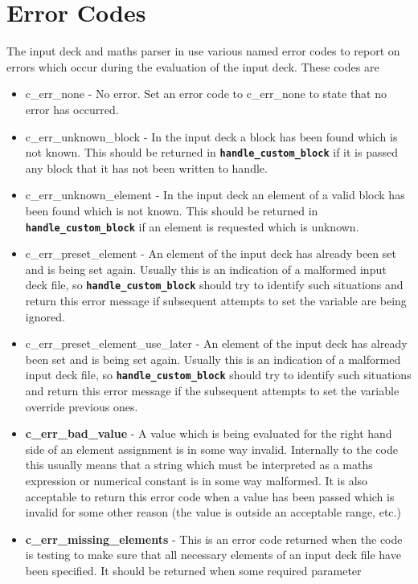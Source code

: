 \documentclass[12pt,a4paper]{article}
\newcommand{\inlinecode}[1]{{\color{warwickred} \bf\texttt{#1}}}
\newcommand{\EPOCH}{{\color{warwickdark}\fontfamily{phv}\selectfont{EPOCH}}}
\begin{document}
\section{Error Codes}
The input deck and maths parser in {\EPOCH} use various named error codes to
report on errors which occur during the evaluation of the input deck. These
codes are
\begin{itemize}
\item c\_err\_none - No error. Set an error code to c\_err\_none to state that
  no error has occurred.
\item c\_err\_unknown\_block - In the input deck a block has been found which is
  not known. This should be returned in \inlinecode{handle\_custom\_block} if
  it is passed any block that it has not been written to handle.
\item c\_err\_unknown\_element - In the input deck an element of a valid block
  has been found which is not known. This should be returned in
  \inlinecode{handle\_custom\_block} if an element is requested which is
  unknown.
\item c\_err\_preset\_element - An element of the input deck has already been
  set and is being set again. Usually this is an indication of a malformed input
  deck file, so \inlinecode{handle\_custom\_block} should try to
  identify such situations and return this error message if
  subsequent attempts to set the variable are being ignored.
\item c\_err\_preset\_element\_use\_later - An element of the input deck has
  already been set and is being set again. Usually this is an indication of a
  malformed input deck file, so \inlinecode{handle\_custom\_block} should try to
  identify such situations and return this error message if
  the subsequent attempts to set the variable override previous ones.
\item {\bf c\_err\_bad\_value} - A value which is being evaluated for the right
  hand side of an element assignment is in some way invalid. Internally to the
  code this usually means that a string which must be interpreted as a maths
  expression or numerical constant is in some way malformed. It is also
  acceptable to return this error code when a value has been passed which is
  invalid for some other reason (the value is outside an acceptable range, etc.)
\item {\bf c\_err\_missing\_elements} - This is an error code returned when the
  code is testing to make sure that all necessary elements of an input deck
  file have been specified. It should be returned when some required parameter

\end{itemize}
\end{document}
